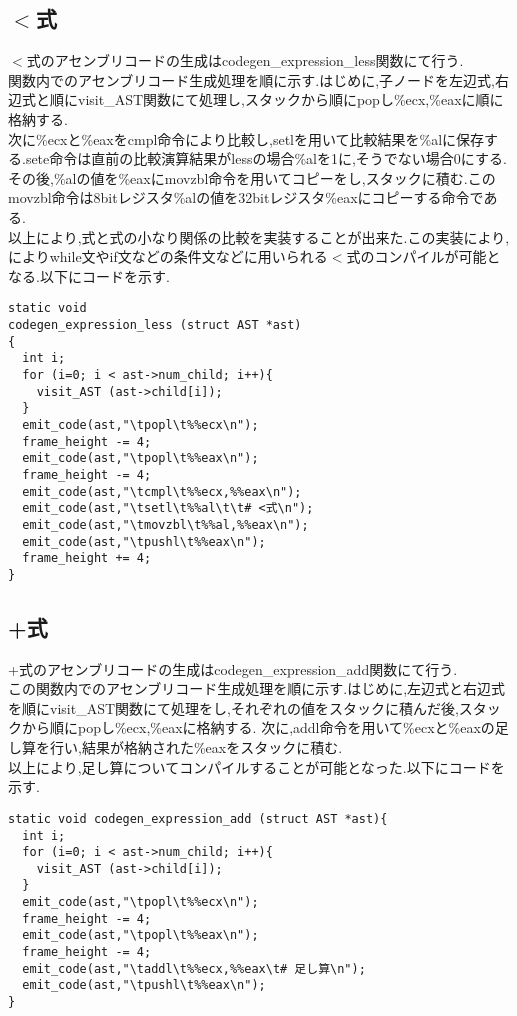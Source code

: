 \documentclass[10pt]{jsarticle}
\begin{document}
\subsection{$<$式}
$<$式のアセンブリコードの生成はcodegen\_expression\_less関数にて行う.\\
関数内でのアセンブリコード生成処理を順に示す.はじめに,子ノードを左辺式,右辺式と順にvisit\_AST関数にて処理し,スタックから順にpopし\%ecx,\%eaxに順に格納する.\\
次に\%ecxと\%eaxをcmpl命令により比較し,setlを用いて比較結果を\%alに保存する.sete命令は直前の比較演算結果がlessの場合\%alを1に,そうでない場合0にする.\\
その後,\%alの値を\%eaxにmovzbl命令を用いてコピーをし,スタックに積む.このmovzbl命令は8bitレジスタ\%alの値を32bitレジスタ\%eaxにコピーする命令である.\\
以上により,式と式の小なり関係の比較を実装することが出来た.この実装により,によりwhile文やif文などの条件文などに用いられる$<$式のコンパイルが可能となる.以下にコードを示す.
\begin{lstlisting}[caption=codegen\_expression\_less関数]
static void
codegen_expression_less (struct AST *ast)
{
  int i;
  for (i=0; i < ast->num_child; i++){
    visit_AST (ast->child[i]);
  }
  emit_code(ast,"\tpopl\t%%ecx\n");
  frame_height -= 4;
  emit_code(ast,"\tpopl\t%%eax\n");
  frame_height -= 4;
  emit_code(ast,"\tcmpl\t%%ecx,%%eax\n");
  emit_code(ast,"\tsetl\t%%al\t\t# <式\n");
  emit_code(ast,"\tmovzbl\t%%al,%%eax\n");
  emit_code(ast,"\tpushl\t%%eax\n");
  frame_height += 4;
}
\end{lstlisting}

\subsection{+式}
+式のアセンブリコードの生成はcodegen\_expression\_add関数にて行う.\\
この関数内でのアセンブリコード生成処理を順に示す.はじめに,左辺式と右辺式を順にvisit\_AST関数にて処理をし,それぞれの値をスタックに積んだ後,スタックから順にpopし\%ecx,\%eaxに格納する.
次に,addl命令を用いて\%ecxと\%eaxの足し算を行い,結果が格納された\%eaxをスタックに積む.\\
以上により,足し算についてコンパイルすることが可能となった.以下にコードを示す.
\begin{lstlisting}[caption=codegen\_expression\_add関数]
static void codegen_expression_add (struct AST *ast){
  int i;
  for (i=0; i < ast->num_child; i++){
    visit_AST (ast->child[i]);
  }
  emit_code(ast,"\tpopl\t%%ecx\n");
  frame_height -= 4;
  emit_code(ast,"\tpopl\t%%eax\n");
  frame_height -= 4;
  emit_code(ast,"\taddl\t%%ecx,%%eax\t# 足し算\n");
  emit_code(ast,"\tpushl\t%%eax\n");
}
\end{lstlisting}
\end{document}
